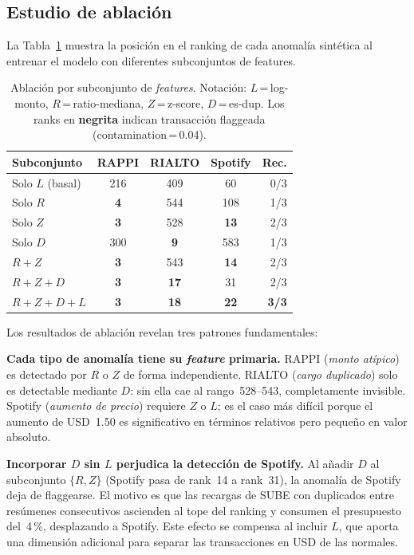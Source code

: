 \documentclass[conference]{IEEEtran}
\begin{document}
\subsection{Estudio de ablaci\'on}
\label{sec:ablacion}

La Tabla~\ref{tab:ablation} muestra la posici\'on en el ranking de cada anomal\'ia
sint\'etica al entrenar el modelo con diferentes subconjuntos de features.

\begin{table}[h]
\caption{Ablaci\'on por subconjunto de \emph{features}. Notaci\'on:
  $L$\,=\,log-monto, $R$\,=\,ratio-mediana, $Z$\,=\,z-score, $D$\,=\,es-dup.
  Los ranks en \textbf{negrita} indican transacci\'on flaggeada
  (contamination\,=\,0.04).}
\label{tab:ablation}
\centering
\begin{tabular}{lcccr}
\toprule
\textbf{Subconjunto} & \textbf{RAPPI} & \textbf{RIALTO} & \textbf{Spotify} & \textbf{Rec.} \\
\midrule
Solo $L$ (basal) & 216 & 409 & 60  & 0/3 \\
Solo $R$         & \textbf{4}   & 544 & 108 & 1/3 \\
Solo $Z$         & \textbf{3}   & 528 & \textbf{13}  & 2/3 \\
Solo $D$         & 300 & \textbf{9}   & 583 & 1/3 \\
$R + Z$          & \textbf{3}   & 543 & \textbf{14}  & 2/3 \\
$R + Z + D$      & \textbf{3}   & \textbf{17}  & 31  & 2/3 \\
\textbf{$R + Z + D + L$} & \textbf{3} & \textbf{18} & \textbf{22} & \textbf{3/3} \\
\bottomrule
\end{tabular}
\end{table}

Los resultados de ablaci\'on revelan tres patrones fundamentales:

\textbf{Cada tipo de anomal\'ia tiene su \emph{feature} primaria.}
RAPPI (\emph{monto at\'ipico}) es detectado por $R$ o $Z$ de forma independiente.
RIALTO (\emph{cargo duplicado}) solo es detectable mediante $D$: sin ella cae al
rango~528--543, completamente invisible. Spotify (\emph{aumento de precio}) requiere
$Z$ o $L$; es el caso m\'as dif\'icil porque el aumento de USD~1.50 es significativo
en t\'erminos relativos pero peque\~no en valor absoluto.

\textbf{Incorporar $D$ sin $L$ perjudica la detecci\'on de Spotify.}
Al a\~nadir $D$ al subconjunto $\{R, Z\}$ (Spotify pasa de rank~14 a rank~31), la
anomal\'ia de Spotify deja de flaggearse. El motivo es que las recargas de SUBE
con duplicados entre res\'umenes consecutivos ascienden al tope del ranking y
consumen el presupuesto del~4\,\%, desplazando a Spotify. Este efecto se compensa
al incluir $L$, que aporta una dimensi\'on adicional para separar las transacciones
en USD de las normales.
\end{document}
